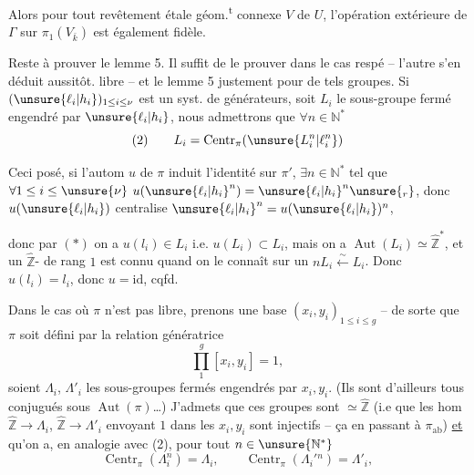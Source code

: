 Alors pour tout revêtement étale géom.\textsuperscript{t} connexe $V$ de $U$, l'opération extérieure de \deleted{\unsure{$\pi$}} $\Gamma$ sur $\pi_1(V_{\bar k})$ est également fidèle.

Reste à prouver le lemme 5. Il suffit de le prouver dans le cas respé -- l'autre s'en déduit aussitôt.    libre -- et le lemme 5  justement pour de tels groupes. Si $(\unsure{\ell_i|h_i})_{1\le i\le\nu}$ est un syst. de générateurs, soit $L_i$ le sous-groupe fermé engendré par $\unsure{\ell_i|h_i}$, nous admettrons que $\forall n\in\mathbb N^*$
\[
(2)\qquad L_i=\operatorname{Centr}_{\pi}(\unsure{L_i^n|\ell_i^n})
\]

Ceci posé, si l'autom $u$ de $\pi$ induit l'identité sur $\pi'$, $\exists n\in\mathbb N^*$ tel que $\forall 1\le i\le\unsure{\nu}$
$u(\unsure{\ell_i|h_i}^{n})=\unsure{\ell_i|h_i}^{n}\unsure{{}_r}$, donc $u(\unsure{\ell_i|h_i})$ centralise $\unsure{\ell_i|h_i}^{n}=u(\unsure{\ell_i|h_i})^{n}$,


donc par $(*)$ on a $u(l_i)\in L_i$ i.e. $u(L_i)\subset L_i$,
mais on a $\operatorname{Aut}(L_i)\simeq\widehat{\mathbb Z}^{*}$, et un
  
$\widehat{\mathbb Z}$-  de rang $1$
 est connu quand on le connaît
sur un $nL_i\xleftarrow{\sim}L_i$.
Donc  $u(l_i)=l_i$,
donc $u=\mathrm{id}$, cqfd.

Dans le cas où $\pi$ n'est pas libre,
prenons une  base $(x_i,y_i)_{1\leq i\leq g}$
-- de sorte que $\pi$ soit défini par la relation génératrice
\[
\tag{3} \prod_1^g[x_i,y_i]=1,
\]
soient $\Lambda_i$, $\Lambda'_i$ les sous-groupes fermés
engendrés par $x_i,y_i$.
 (Ils sont d'ailleurs tous conjugués sous
$\operatorname{Aut}(\pi)$\ldots) J'admets que ces groupes
sont $\simeq\widehat{\mathbb Z}$ (i.e que les hom
 $\widehat{\mathbb Z}\longrightarrow\Lambda_i$,
$\widehat{\mathbb Z}\longrightarrow\Lambda'_i$ envoyant $1$ dans les
$x_i,y_i$ sont injectifs -- ça 
 en passant à $\pi_{\mathrm{ab}}$)
\uline{et} qu'on a, en analogie avec (2), pour
tout $n\in\unsure{\mathbb N^{*}}$
\[
\tag{4}
\operatorname{Centr}_{\pi}(\Lambda_i^n)=\Lambda_i,\qquad
\operatorname{Centr}_{\pi}(\Lambda_i'{}^n)=\Lambda'_i,
\]

